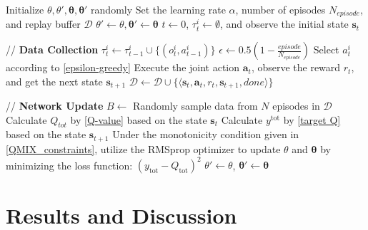 \documentclass[10pt,journal,letterpaper]{IEEEtran}
\begin{document}
\begin{algorithm}[t]
    \caption{MBA-RL charging control framework}
    \label{alg:QMIX}

    \begin{algorithmic}[1]
        \STATE Initialize $\theta, \theta', \bm{\theta}, \bm{\theta}'$ randomly
        \STATE Set the learning rate $\alpha$, number of episodes $N_{episode}$, and replay buffer $\mathcal{D}$
        \STATE $\theta' \leftarrow \theta, \bm{\theta}' \leftarrow \bm{\theta}$
            \STATE $t\leftarrow 0$, $\tau_t^i \leftarrow \emptyset$, and observe the initial state $\mathbf{s}_t$

            // \textbf{Data Collection}
                    \STATE $\tau_t^i \leftarrow \tau_{t-1}^i \cup \{(o_t^i, a_{t-1}^i)\}$
                    \STATE $\epsilon \gets 0.5 (1 - \frac{episode}{N_{episode}})$
                    \STATE Select $a_t^i$ according to \eqref{epsilon-greedy}
                \ENDFOR
                \STATE Execute the joint action $\mathbf{a}_t$, observe the reward $r_t$, and get the next state $\mathbf{s}_{t+1}$
                \STATE $\mathcal{D} \leftarrow \mathcal{D} \cup \{ \langle\mathbf{s}_t, \mathbf{a}_t, r_t, \mathbf{s}_{t+1}, done\rangle \}$
            \ENDWHILE

            // \textbf{Network Update}
                \STATE $B \leftarrow$ Randomly sample data from $N$ episodes in $\mathcal{D}$
                    \STATE Calculate $Q_{tot}$ by \eqref{Q-value} based on the state $\mathbf{s}_t$
                    \STATE Calculate $y^{\text{tot}}$ by \eqref{target Q} based on the state $\mathbf{s}_{t+1}$
                \ENDFOR
                \STATE Under the monotonicity condition given in \eqref{QMIX_constraints}, utilize the RMSprop  optimizer \cite{zou2019sufficient} to update $\theta$ and $\bm{\theta}$ by minimizing the loss function: $\left( y_{\text{tot}} - Q_{\text{tot}} \right)^2$
            \ENDIF
                \STATE $\theta' \leftarrow \theta$, $\bm{\theta}' \leftarrow \bm{\theta}$
            \ENDIF
        \ENDFOR
    \end{algorithmic}
\end{algorithm}

\section{Results and Discussion}
\end{document}
